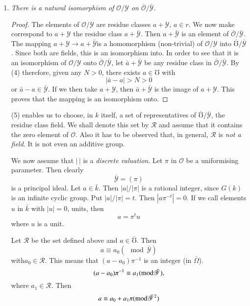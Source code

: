 \begin{enumerate}[1)]
\item \textit{There is a natural isomorphism of
  $\mathscr{O}/\mathscr{Y}$ on $\bar{\mathscr{O}}/
  \bar{\mathscr{Y}}$.} 

\begin{proof}%
The elements of $\mathscr{O}/\mathscr{Y}$ are residue classes $a +
\mathscr{Y}$, $a \in r$. We now make correspond to $a + \mathscr{Y}$ the
residue class $a + \bar{\mathscr{Y}}$. Then $a + \bar{\mathscr{Y}}$ is
an element of $\bar{\mathscr{O}}/ \bar{\mathscr{Y}}$. The mapping $a +
\mathscr{Y} \to a + \bar{\mathscr{Y}}$\pageoriginale is a homomorphism
(non-trivial) of $\mathscr{O}/\mathscr{Y}$ into $\bar{\mho}/
\bar{\mathscr{Y}}$. Since both are fields, this is an isomorphism
into. In order to see that it is an isomorphism of $\mathscr{O}/
\mathscr{Y}$ onto $\bar{\mathscr{O}}/ \bar{\mathscr{Y}}$, let $\bar{a}
+ \bar{\mathscr{Y}}$ be any residue class in $\bar{\mathscr{O}}/
\bar{\mathscr{Y}}$. By (4) therefore, given any $N > 0$, there
exists $a \in \mho$ with 
$$
|\bar{a} - a| > N > 0
$$
or $\bar{a} - a \in \bar{\mathscr{Y}}$. If we then take $a +
\mathscr{Y}$, then $\bar{a} + \bar{\mathscr{Y}}$ is the image of $a +
\mathscr{Y}$. This proves that the mapping is an isomorphism onto. 
\end{proof}

(5) enables us to choose, in $k$ itself, a set of representatives of
 $\bar{\mho} /\bar{\mathscr{Y}}$, the residue class field. We
 shall denote this set by $\mathscr{R}$ and assume that it contains
 the zero element of $\mathscr{O}$. Also it has to be observed that,
 in general, $\mathscr{R}$ is \textit{not a field}. It is not even an
 additive group. 


We now assume that $| \, |$ is a \textit{discrete valuation}. Let $\pi$
in $\mathscr{O}$ be a uniformising parameter. Then clearly 
$$
\bar{\mathscr{Y}} = (\pi) 
$$
is a principal ideal. Let $a \in \bar{k}$. Then $|a|/ |\pi|$ is a
rational integer, since $G(k)$ is an infinite cyclic group. Put $|a|/
|\pi| = t$. Then $|a \pi^{-t}| = 0$. If we call elements $u$ in
$\bar{k}$ with $|u| = 0$, units, then 
$$
a = \pi^t u
$$
where $u$ is a unit.

Let $\mathscr{R}$ be the set defined above and $a \in
\bar{\mho}$. Then 
$$
a \equiv a_0 (\mod \bar{\mathscr{Y}})
$$
with\pageoriginale $a_0 \in \mathscr{R}$. This means that $(a-a_0)
\pi^{-1}$ is an integer (in $\bar{\Omega}$).  
$$
(a-a_0) \pi^{-1} \equiv a_1 ({\rm mod} \bar{\mathscr{Y}}),
$$
where $a_1 \in \mathscr{R}$. Then
$$
a \equiv a_0 + a_1 \pi ({\rm mod} \bar{\mathscr{Y}}^2)
$$


\end{enumerate}
